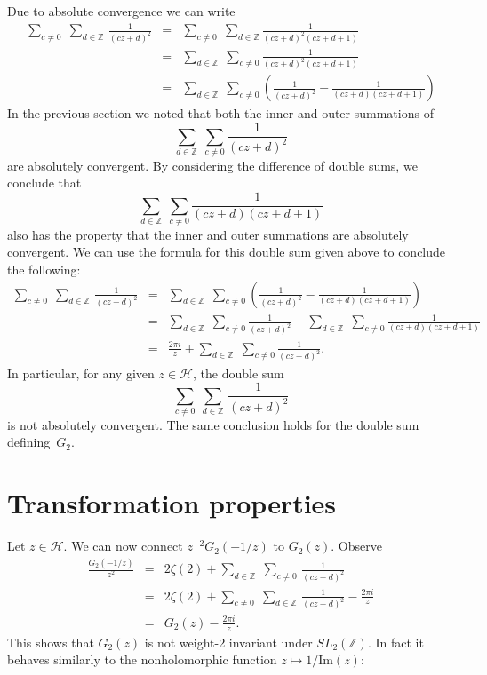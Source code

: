 \documentclass {amsart}
\theoremstyle{plain}
\theoremstyle{definition}
\theoremstyle{remark}
\newcommand{\bZ}{{\mathbb{Z}}}
\newcommand{\h}{{\mathcal{H}}}
\begin{document}
Due to absolute convergence we can write
\begin{eqnarray*}
\sum_{c \ne 0} \; \sum_{d \in \bZ} \, \frac{1}{(c z + d)^2}
&=&
\sum_{c \ne 0} \; \sum_{d \in \bZ}
 \frac{1}{(c z + d)^2 (c z + d + 1)}
\\
&=&
\sum_{d \in \bZ}  \; \sum_{c \ne 0}
 \frac{1}{(c z + d)^2 (c z + d + 1)}
\\
&=&
\sum_{d \in \bZ}  \; \sum_{c \ne 0}\left( \frac{1}{(c z + d)^2}
-
 \frac{1}{(c z + d) (c z + d + 1)}
\right)
\end{eqnarray*}
In the previous section we noted that both the inner and outer summations
of
$$
\sum_{d \in \bZ}  \; \sum_{c \ne 0}  \frac{1}{(c z + d)^2}
$$
are absolutely convergent. By considering the difference of double sums,
we conclude that 
$$
\sum_{d \in \bZ}  \; \sum_{c \ne 0}
 \frac{1}{(c z + d) (c z + d + 1)}
$$
also has the property that the inner and outer summations are absolutely convergent.
We can use the formula for this double sum given above to conclude the following:
\begin{eqnarray*}
\sum_{c \ne 0} \; \sum_{d \in \bZ} \, \frac{1}{(c z + d)^2}
&=&
\sum_{d \in \bZ}  \; \sum_{c \ne 0}\left( \frac{1}{(c z + d)^2}
-
 \frac{1}{(c z + d) (c z + d + 1)}
\right)
\\
&=&
\sum_{d \in \bZ}  \; \sum_{c \ne 0}
\frac{1}{(c z + d)^2}
-
\sum_{d \in \bZ}  \; \sum_{c \ne 0}
 \frac{1}{(c z + d) (c z + d + 1)}
 \\
&=&
 \frac{2 \pi i} {z} + 
\sum_{d \in \bZ}  \; \sum_{c \ne 0}
\frac{1}{(c z + d)^2}.
\end{eqnarray*}
In particular, for any given $z \in \h$, the double
sum 
$$
\sum_{c \ne 0} \; \sum_{d \in \bZ} \, \frac{1}{(c z + d)^2}
$$
is not absolutely convergent. The same conclusion holds for the double
sum defining~$G_2$.





\section {Transformation properties}

Let $z \in \h$.
We can now connect $z^{-2} G_2(-1/z)$ to $G_2(z)$.
Observe
\begin{eqnarray*}
\frac{G_2 (-1/z) }{z^2}
&=&
2 \zeta(2) + \sum_{d \in \bZ} \; \sum_{c \ne 0}  \, \frac{1}{(c z + d)^2} 
\\
&=&
2 \zeta(2)
+
\sum_{c \ne 0} \; \sum_{d \in \bZ} \, \frac{1}{(c z + d)^2}
 -
 \frac{2 \pi i} {z}
 \\
&=&
G_2(z)
 -
 \frac{2 \pi i} {z}.
\end{eqnarray*}
This shows that $G_2(z)$ is not weight-2 invariant under $SL_2(\bZ)$.
In fact it behaves similarly to the nonholomorphic function $z \mapsto 1/\mathrm{Im}(z)$:
\end{document}

